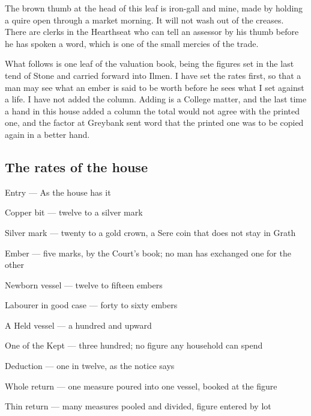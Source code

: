 \documentclass{design/chronicle}
\begin{document}
The brown thumb at the head of this leaf is iron-gall and mine, made by holding a quire open through a market morning. It will not wash out of the creases. There are clerks in the Hearthseat who can tell an assessor by his thumb before he has spoken a word, which is one of the small mercies of the trade.

What follows is one leaf of the valuation book, being the figures set in the last tend of Stone and carried forward into Ilmen. I have set the rates first, so that a man may see what an ember is said to be worth before he sees what I set against a life. I have not added the column. Adding is a College matter, and the last time a hand in this house added a column the total would not agree with the printed one, and the factor at Greybank sent word that the printed one was to be copied again in a better hand.

\subsection*{The rates of the house}

Entry — As the house has it\par

Copper bit — twelve to a silver mark\par

Silver mark — twenty to a gold crown, a Sere coin that does not stay in Grath\par

Ember — five marks, by the Court’s book; no man has exchanged one for the other\par

Newborn vessel — twelve to fifteen embers\par

Labourer in good case — forty to sixty embers\par

A Held vessel — a hundred and upward\par

One of the Kept — three hundred; no figure any household can spend\par

Deduction — one in twelve, as the notice says\par

Whole return — one measure poured into one vessel, booked at the figure\par

Thin return — many measures pooled and divided, figure entered by lot\par
\end{document}

